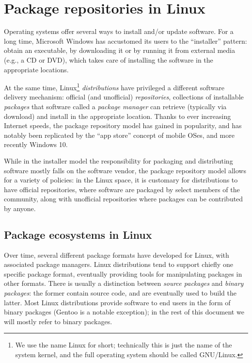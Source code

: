 \documentclass{deliverablereport}
\author{Luca De Feo \emph{et al.}}
\begin{document}
\maketitle
\githubissuedescription
\tableofcontents
\clearpage

\section{Package repositories in Linux}

Operating systems offer several ways to install and/or update
software. %
For a long time, Microsoft Windows has accustomed its users to the
``installer'' pattern: obtain an executable, by downloading it or by
running it from external media (e.g., a CD or DVD), which takes care
of installing the software in the appropriate locations.

At the same time, Linux\footnote{We use the name Linux for short;
  technically this is just the name of the system kernel, and the full
  operating system should be called GNU/Linux.}
\emph{distributions} have privileged a
different software delivery mechanism: official (and unofficial)
\emph{repositories}, collections of installable \emph{packages} that
software called a \emph{package manager} can retrieve (typically via
download) and install in the appropriate location. %
Thanks to ever increasing Internet speeds, the package repository
model has gained in popularity, and has notably been replicated by the
``app store'' concept of mobile OSes, and more recently Windows 10.

While in the installer model the responsibility for packaging and
distributing software mostly falls on the software vendor, the package
repository model allows for a variety of policies: in the Linux space,
it is customary for distributions to have official repositories, where
software are packaged by select members of the community, along with
unofficial repositories where packages can be contributed by anyone.

\subsection{Package ecosystems in Linux}

Over time, several different package formats have developed for Linux,
with associated package managers. %
Linux distributions tend to support chiefly one specific package
format, eventually providing tools for manipulating packages in other
formats. %
There is usually a distinction between \emph{source packages} and
\emph{binary packages}: the former contain source code, and are
eventually used to build the latter. %
Most Linux distributions provide software to end users in the form of
binary packages (Gentoo is a notable exception); in the rest of this
document we will mostly refer to binary packages.
\end{document}
